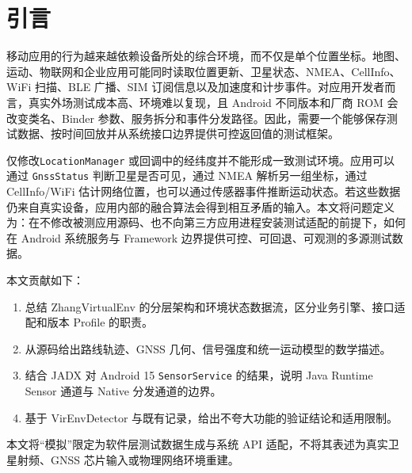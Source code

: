 \section{引言}
移动应用的行为越来越依赖设备所处的综合环境，而不仅是单个位置坐标。地图、运动、物联网和企业应用可能同时读取位置更新、卫星状态、NMEA、CellInfo、WiFi 扫描、BLE 广播、SIM 订阅信息以及加速度和计步事件。对应用开发者而言，真实外场测试成本高、环境难以复现，且 Android 不同版本和厂商 ROM 会改变类名、Binder 参数、服务拆分和事件分发路径。因此，需要一个能够保存测试数据、按时间回放并从系统接口边界提供可控返回值的测试框架。

仅修改\texttt{LocationManager} 或回调中的经纬度并不能形成一致测试环境。应用可以通过 \texttt{GnssStatus} 判断卫星是否可见，通过 NMEA 解析另一组坐标，通过 CellInfo/WiFi 估计网络位置，也可以通过传感器事件推断运动状态。若这些数据仍来自真实设备，应用内部的融合算法会得到相互矛盾的输入。本文将问题定义为：在不修改被测应用源码、也不向第三方应用进程安装测试适配的前提下，如何在 Android 系统服务与 Framework 边界提供可控、可回退、可观测的多源测试数据。

本文贡献如下：
\begin{enumerate}
  \item 总结 ZhangVirtualEnv 的分层架构和环境状态数据流，区分业务引擎、接口适配和版本 Profile 的职责。
  \item 从源码给出路线轨迹、GNSS 几何、信号强度和统一运动模型的数学描述。
  \item 结合 JADX 对 Android 15 \texttt{SensorService} 的结果，说明 Java Runtime Sensor 通道与 Native 分发通道的边界。
  \item 基于 VirEnvDetector 与既有记录，给出不夸大功能的验证结论和适用限制。
\end{enumerate}

本文将“模拟”限定为软件层测试数据生成与系统 API 适配，不将其表述为真实卫星射频、GNSS 芯片输入或物理网络环境重建。
